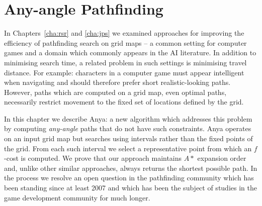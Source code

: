 \chapter{Any-angle Pathfinding}
\label{cha:anya}
In Chapters~\ref{cha:rsr} and \ref{cha:jps} we examined approaches for
improving the efficiency of pathfinding search on grid maps -- a common
setting for computer games and a domain which commonly appears in the AI
literature. 
In addition to minimising search time, a related problem in such settings
is minimising travel distance. For example: characters in a computer game 
must appear intelligent when navigating and should therefore prefer short
realistic-looking paths. However, paths which are computed on a grid map, 
even optimal paths, necessarily restrict movement to the fixed set of 
locations defined by the grid. 
\par
In this chapter we describe Anya: a new algorithm which addresses this
problem by computing \emph{any-angle} paths that do not have such constraints.
Anya operates on an input grid map but searches using intervals rather than 
the fixed points of the grid. 
From each such interval we select a representative point from which an
$f$-cost is computed. 
We prove that our approach maintains $A*$ expansion order and, unlike other
similar approaches, always returns the shortest possible path.
In the process we resolve an open question in the pathfinding community which
has been standing since at least 2007 and which has been the subject of
studies in the game development community for much longer.


